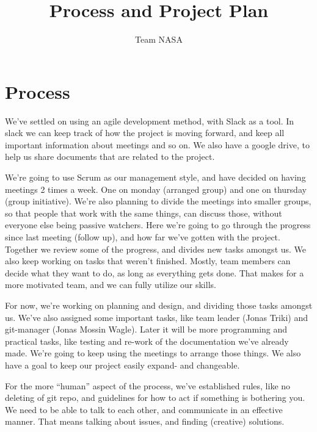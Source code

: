 \documentclass{article}
\title{Process and Project Plan}
\author{Team NASA}
\date{}
\begin{document}
\maketitle
\section*{Process}
We’ve settled on using an agile development method, with Slack as a tool. In slack we can keep track of how the project is moving forward, and keep all important information about meetings and so on. We also have a google drive, to help us share documents that are related to the project.

We’re going to use Scrum as our management style, and have decided on having meetings 2 times a week. One on monday (arranged group) and one on thursday (group initiative). We’re also planning to divide the meetings into smaller groups, so that people that work with the same things, can discuss those, without everyone else being passive watchers. 
Here we’re going to go through the progress since last meeting (follow up), and how far we’ve gotten with the project. Together we review some of the progress, and divides new tasks amongst us. We also keep working on tasks that weren’t finished. Mostly, team members can decide what they want to do, as long as everything gets done. That makes for a more motivated team, and we can fully utilize our skills.

For now, we’re working on planning and design, and dividing those tasks amongst us. We’ve also assigned some important tasks, like team leader (Jonas Triki) and git-manager (Jonas Mossin Wagle). Later it will be more programming and practical tasks, like testing and re-work of the documentation we’ve already made. We’re going to keep using the meetings to arrange those things. We also have a goal to keep our project easily expand- and changeable.

For the more “human” aspect of the process, we’ve established rules, like no deleting of git repo, and guidelines for how to act if something is bothering you. We need to be able to talk to each other, and communicate in an effective manner. That means talking about issues, and finding (creative) solutions. 
\end{document}
